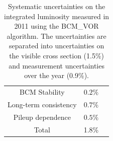 \begin{table}[htbp]
\begin{tabular}{ccl}
		BCM Stability & $0.2\%$ & \\
		{Long-term consistency} & {$0.7\%$} & \\
		{Pileup dependence} & {$0.5\%$} & \\
		\hline
		\hline
		Total & 1.8\% & \\
		\hline
	\end{tabular}
	\caption{Systematic uncertainties on the integrated luminosity measured in 2011 using the BCM\_VOR algorithm. The uncertainties are separated into uncertainties on the visible cross section (1.5\%) and measurement uncertainties over the year (0.9\%).}
	\label{table:reco-luminosity-uncertainties}
\end{table}

\begin{figure}
	\centering
	\hfill
	\hfill
\end{figure}
